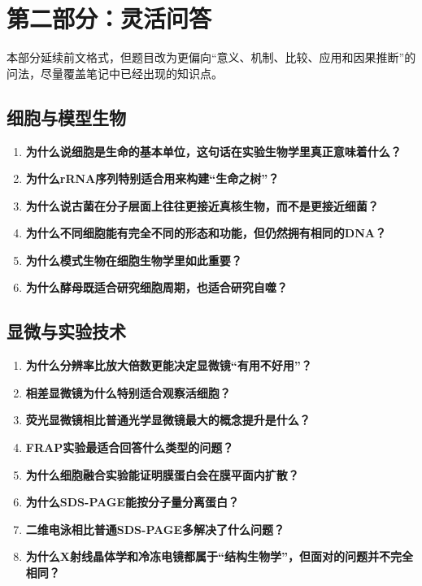 \documentclass[12pt,fontset=none]{ctexart}
\begin{document}
\section*{第二部分：灵活问答}
本部分延续前文格式，但题目改为更偏向“意义、机制、比较、应用和因果推断”的问法，尽量覆盖笔记中已经出现的知识点。

\subsection*{细胞与模型生物}
\begin{enumerate}
\item \textbf{为什么说细胞是生命的基本单位，这句话在实验生物学里真正意味着什么？}

\item \textbf{为什么rRNA序列特别适合用来构建“生命之树”？}

\item \textbf{为什么说古菌在分子层面上往往更接近真核生物，而不是更接近细菌？}

\item \textbf{为什么不同细胞能有完全不同的形态和功能，但仍然拥有相同的DNA？}

\item \textbf{为什么模式生物在细胞生物学里如此重要？}

\item \textbf{为什么酵母既适合研究细胞周期，也适合研究自噬？}

\end{enumerate}



\subsection*{显微与实验技术}
\begin{enumerate}
\item \textbf{为什么分辨率比放大倍数更能决定显微镜“有用不好用”？}

\item \textbf{相差显微镜为什么特别适合观察活细胞？}

\item \textbf{荧光显微镜相比普通光学显微镜最大的概念提升是什么？}

\item \textbf{FRAP实验最适合回答什么类型的问题？}

\item \textbf{为什么细胞融合实验能证明膜蛋白会在膜平面内扩散？}

\item \textbf{为什么SDS-PAGE能按分子量分离蛋白？}

\item \textbf{二维电泳相比普通SDS-PAGE多解决了什么问题？}

\item \textbf{为什么X射线晶体学和冷冻电镜都属于“结构生物学”，但面对的问题并不完全相同？}

\end{enumerate}
\end{document}
